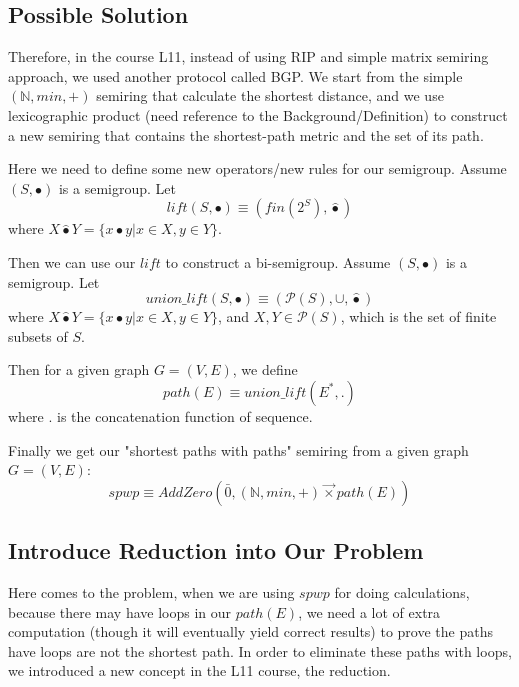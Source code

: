 \documentclass[a4paper,12pt,twoside,openright]{report}
\begin{document}
\subsection{Possible Solution}
Therefore, in the course L11, instead of using RIP and simple matrix semiring approach, we used another protocol called BGP. We start from the simple $(\mathbb{N},min,+)$ semiring that calculate the shortest distance, and we use lexicographic product (need reference to the Background/Definition) to construct a new semiring that contains the shortest-path metric and the set of its path.

Here we need to define some new operators/new rules for our semigroup.
Assume $(S,\bullet)$ is a semigroup. Let
\begin{equation}
  \label{eq:lift:def} 
  lift(S,\bullet)  \equiv (fin(2^S),\hat\bullet)
\end{equation}   
where
$X \hat\bullet Y = \{x\bullet y |x\in X,y\in Y\}$.

Then we can use our $lift$ to construct a bi-semigroup.
Assume $(S,\bullet)$ is a semigroup. Let
\begin{equation}
  \label{eq:unionlift:def} 
  union\_lift(S,\bullet)\equiv (\mathcal{P}(S),\cup,\hat\bullet)
\end{equation}  
where
$X \hat\bullet Y = \{x\bullet y |x\in X,y\in Y\}$, and $X,Y \in \mathcal{P}(S)$, which is the set of finite subsets of $S$.

Then for a given graph $G = (V,E)$, we define
\begin{equation}
  \label{eq:path:def} 
  path(E)\equiv union\_lift(E^*,.)
\end{equation}  
where . is the concatenation function of sequence.

Finally we get our "shortest paths with paths" semiring from a given graph $G = (V,E)$: 
\begin{equation}
  \label{eq:spwp:def} 
  spwp \equiv AddZero(\bar0,(\mathbb{N},min,+) \overrightarrow{\times} path(E))
\end{equation} 

\subsection{Introduce Reduction into Our Problem}
Here comes to the problem, when we are using $spwp$ for doing calculations, because there may have loops in our $path(E)$, we need a lot of extra computation (though it will eventually yield correct results) to prove the paths have loops are not the shortest path.
In order to eliminate these paths with loops, we introduced a new concept in the L11 course, the reduction.
\end{document}
